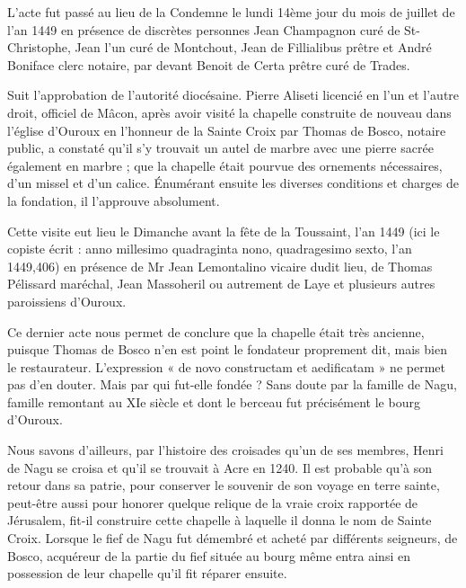 L'acte fut passé au lieu de la Condemne le lundi 14ème jour du mois de juillet de l'an 1449 en présence de discrètes personnes Jean Champagnon curé de St-Christophe, Jean l'un curé de Montchout, Jean de Fillialibus prêtre et André Boniface clerc notaire, par devant Benoit de Certa prêtre curé de Trades.

Suit l'approbation de l'autorité diocésaine. Pierre Aliseti licencié en l'un et l'autre droit, officiel de Mâcon, après avoir visité la chapelle construite de nouveau dans l'église d'Ouroux en l'honneur de la Sainte Croix par Thomas de Bosco, notaire public, a constaté qu'il s'y trouvait un autel de marbre avec une pierre sacrée également en marbre ; que la chapelle était pourvue des ornements nécessaires, d'un missel et d'un calice. Énumérant ensuite les diverses conditions et charges de la fondation, il l'approuve absolument.

Cette visite eut lieu le Dimanche avant la fête de la Toussaint, l'an 1449 (ici le copiste écrit : anno millesimo quadraginta nono, quadragesimo sexto, l'an 1449,406) en présence de Mr Jean Lemontalino vicaire dudit lieu, de Thomas Pélissard maréchal, Jean Massoheril ou autrement de Laye et plusieurs autres paroissiens d'Ouroux.

Ce dernier acte nous permet de conclure que la chapelle était très ancienne, puisque Thomas de Bosco n'en est point le fondateur proprement dit, mais bien le restaurateur. L'expression « de novo constructam et aedificatam » ne permet pas d'en douter. Mais par qui fut-elle fondée ? Sans doute par la famille de Nagu, famille remontant au XIe siècle et dont le berceau fut précisément le bourg d'Ouroux.

Nous savons d'ailleurs, par l'histoire des croisades qu'un de ses membres, Henri de Nagu se croisa et qu'il se trouvait à Acre en 1240. Il est probable qu'à son retour dans sa patrie, pour conserver le souvenir
de son voyage en terre sainte, peut-être aussi pour honorer quelque relique de la vraie croix rapportée de Jérusalem, fit-il construire cette chapelle à laquelle il donna le nom de Sainte Croix. Lorsque le fief de Nagu fut démembré et acheté par différents seigneurs, de Bosco, acquéreur de la partie du fief située au bourg même entra ainsi en possession de leur chapelle qu'il fit réparer ensuite.

